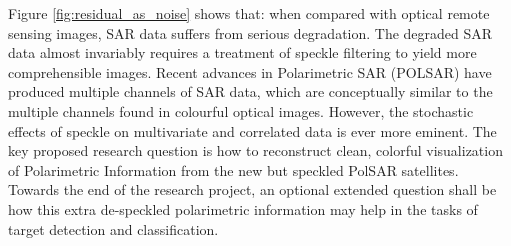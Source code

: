
Figure 
	\ref{fig:residual_as_noise} 
shows that: when compared with optical remote sensing images, SAR data suffers from serious degradation.
The degraded SAR data almost invariably requires a treatment of speckle filtering to yield more comprehensible images.
Recent advances in Polarimetric SAR (POLSAR) have produced multiple channels of SAR data, which are conceptually similar to the multiple channels found in colourful optical images.
However, the stochastic effects of speckle on multivariate and correlated data is ever more eminent.
The key proposed research question is how to reconstruct clean, colorful visualization of Polarimetric Information from the new but speckled PolSAR satellites.
Towards the end of the research project, an optional extended question shall be how this extra de-speckled polarimetric information may help in the tasks of target detection and classification. 


